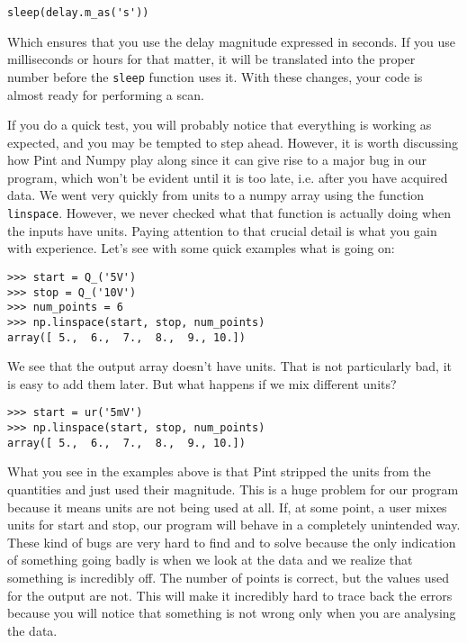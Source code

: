 \begin{verbatim}
sleep(delay.m_as('s'))
\end{verbatim}

Which ensures that you use the delay magnitude expressed in seconds.  If you use milliseconds or hours for that matter, it will be translated into the proper number before the \texttt{sleep} function uses it. With these changes, your code is almost ready for performing a scan. 

If you do a quick test, you will probably notice that everything is working as expected, and you may be tempted to step ahead. However, it is worth discussing how Pint and Numpy play along since it can give rise to a major bug in our program, which won't be evident until it is too late, i.e. after you have acquired data. We went very quickly from units to a numpy array using the function \texttt{linspace}. However, we never checked what that function is actually doing when the inputs have units. Paying attention to that crucial detail is what you gain with experience. Let's see with some quick examples what is going on:

\begin{verbatim}
>>> start = Q_('5V')
>>> stop = Q_('10V')
>>> num_points = 6
>>> np.linspace(start, stop, num_points)
array([ 5.,  6.,  7.,  8.,  9., 10.])
\end{verbatim}

We see that the output array doesn't have units. That is not particularly bad, it is easy to add them later. But what happens if we mix different units?

\begin{verbatim}
>>> start = ur('5mV')
>>> np.linspace(start, stop, num_points)
array([ 5.,  6.,  7.,  8.,  9., 10.])
\end{verbatim}

What you see in the examples above is that Pint stripped the units from the quantities and just used their magnitude. This is a huge problem for our program because it means units are not being used at all. If, at some point, a user mixes units for start and stop, our program will behave in a completely unintended way. These kind of bugs are very hard to find and to solve because the only indication of something going badly is when we look at the data and we realize that something is incredibly off. The number of points is correct, but the values used for the output are not. This will make it incredibly hard to trace back the errors because you will notice that something is not wrong only when you are analysing the data. 

